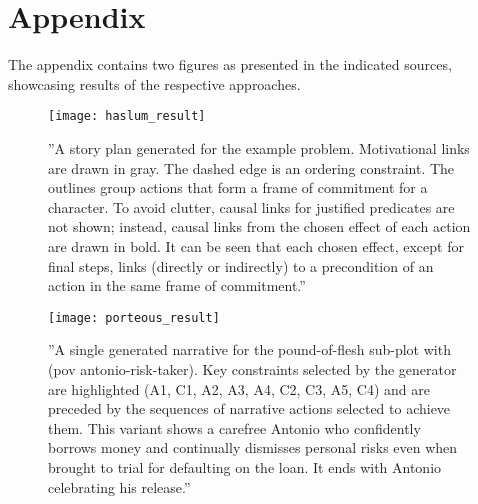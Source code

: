 \section{Appendix}\label{appendix}
The appendix contains two figures as presented in the indicated sources, showcasing results of the respective approaches.
\begin{figure}[htbp]
 \centering
 \texttt{[image: haslum\_result]}
 \caption{''A story plan generated for the example problem. Motivational links are drawn in gray. The dashed edge is an ordering constraint. The outlines group actions that form a frame of commitment for a character. To avoid clutter, causal links for justified predicates are not shown; instead, causal links from the chosen effect of each action are drawn in bold. It can be seen that each chosen effect, except for final steps, links (directly or indirectly) to a precondition of an action in the same frame of commitment.'' \cite{Haslum14}}
 \label{fig:a1}
\end{figure}
\begin{figure}[htbp]
 \centering
 \texttt{[image: porteous\_result]}
 \caption{''A single generated narrative for the pound-of-flesh sub-plot with (pov antonio-risk-taker). Key constraints selected by the generator are highlighted (A1, C1, A2, A3, A4, C2, C3, A5, C4) and are preceded by the sequences of narrative actions selected to achieve them. This variant shows a carefree Antonio who confidently borrows money and continually dismisses personal risks even when brought to trial for defaulting on the loan. It ends with Antonio celebrating his release.'' \cite{Porteous10}}
 \label{fig:a2}
\end{figure}
